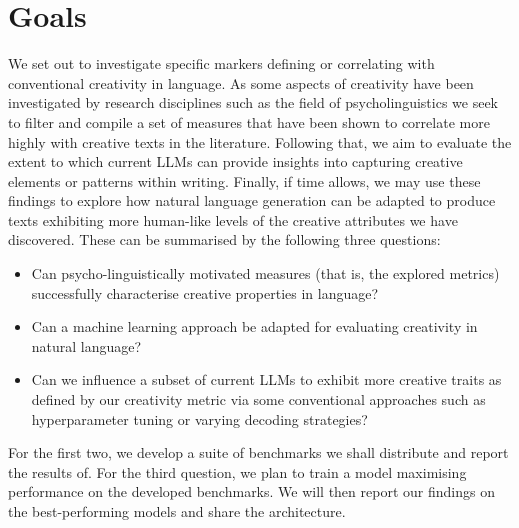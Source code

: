 \documentclass[a4paper,12pt]{article}
\newcommand{\ajs}[1]{\textcolor{orange}{[AJS: #1]}}
\begin{document}
\section*{Goals}
We set out to investigate specific markers defining or correlating with conventional creativity in language. As some aspects of creativity have been investigated by research disciplines such as the field of psycholinguistics 
we seek to filter and compile a set of measures that have been shown to correlate more highly with creative texts in the literature. 
Following that, we aim to evaluate the extent to which current LLMs can provide insights into capturing creative elements or patterns within writing. Finally, if time allows, we may use these findings to explore how natural language generation can be adapted to produce texts exhibiting more human-like levels of the creative attributes we have discovered. These can be summarised by the following three questions:

\begin{itemize}
    \item Can psycho-linguistically motivated measures (that is, the explored metrics) successfully characterise creative properties in language?
    \item Can a machine learning approach be adapted for evaluating creativity in natural language?
    \item Can we influence a subset of current LLMs to exhibit more creative traits as defined by our creativity metric via some conventional approaches such as hyperparameter tuning or varying decoding strategies? 
\end{itemize}

For the first two, we develop a suite of benchmarks we shall distribute and report the results of. 
For the third question, we plan to train a model maximising performance on the developed benchmarks. We will then report our findings on the best-performing models and share the architecture.

\end{document}
